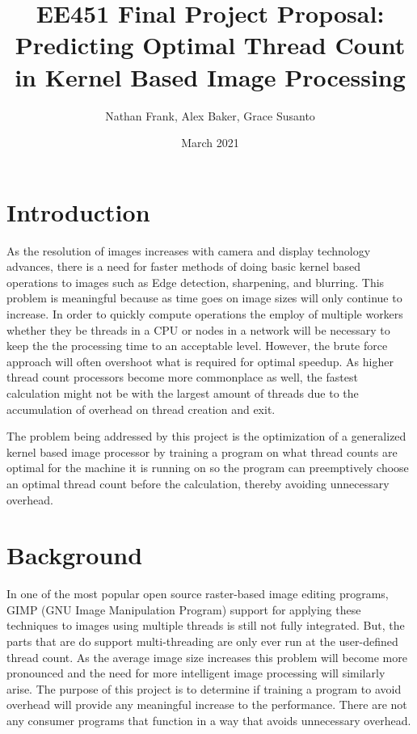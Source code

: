 \documentclass{article}
\title{EE451 Final Project Proposal: \\Predicting Optimal Thread Count in Kernel Based Image Processing}
\author{Nathan Frank, Alex Baker, Grace Susanto}
\date{March 2021}
\begin{document}
\maketitle

\section{Introduction}

As the resolution of images increases with camera and display technology advances, there is a need for faster methods of doing basic kernel based operations to images such as Edge detection, sharpening, and blurring.  This problem is meaningful because as time goes on image sizes will only continue to increase.  In order to quickly compute operations the employ of multiple workers whether they be threads in a CPU or nodes in a network will be necessary to keep the the processing time to an acceptable level.  However, the brute force approach will often overshoot what is required for optimal speedup.  As higher thread count processors become more commonplace as well, the fastest calculation might not be with the largest amount of threads due to the accumulation of overhead on thread creation and exit.

The problem being addressed by this project is the optimization of a generalized kernel based image processor by training a program on what thread counts are optimal for the machine it is running on so the program can preemptively choose an optimal thread count before the calculation, thereby avoiding unnecessary overhead.

\section{Background}

In one of the most popular open source raster-based image editing programs, GIMP (GNU Image Manipulation Program) support for applying these techniques to images using multiple threads is still not fully integrated.  But, the parts that are do support multi-threading are only ever run at the user-defined thread count.  As the average image size increases this problem will become more pronounced and the need for more intelligent image processing will similarly arise.  The purpose of this project is to determine if training a program to avoid overhead will provide any meaningful increase to the performance.  There are not any consumer programs that function in a way that avoids unnecessary overhead.
\end{document}
